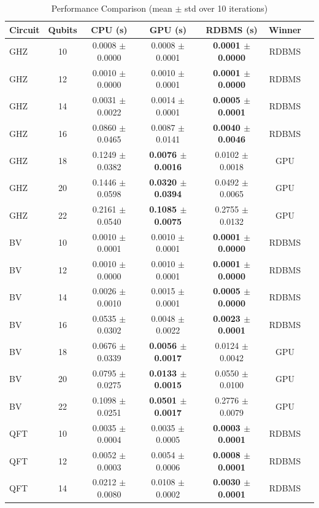 
\begin{table}[htbp]
\centering
\caption{Performance Comparison (mean $\pm$ std over 10 iterations)}
\label{tab:main_results}
\begin{tabular}{lcccccc}
\toprule
\textbf{Circuit} & \textbf{Qubits} & \textbf{CPU (s)} & \textbf{GPU (s)} & \textbf{RDBMS (s)} & \textbf{Winner} \\
\midrule
GHZ & 10 & 0.0008 $\pm$ 0.0000 & 0.0008 $\pm$ 0.0001 & \textbf{0.0001 $\pm$ 0.0000} & RDBMS \\
GHZ & 12 & 0.0010 $\pm$ 0.0000 & 0.0010 $\pm$ 0.0001 & \textbf{0.0001 $\pm$ 0.0000} & RDBMS \\
GHZ & 14 & 0.0031 $\pm$ 0.0022 & 0.0014 $\pm$ 0.0001 & \textbf{0.0005 $\pm$ 0.0001} & RDBMS \\
GHZ & 16 & 0.0860 $\pm$ 0.0465 & 0.0087 $\pm$ 0.0141 & \textbf{0.0040 $\pm$ 0.0046} & RDBMS \\
GHZ & 18 & 0.1249 $\pm$ 0.0382 & \textbf{0.0076 $\pm$ 0.0016} & 0.0102 $\pm$ 0.0018 & GPU \\
GHZ & 20 & 0.1446 $\pm$ 0.0598 & \textbf{0.0320 $\pm$ 0.0394} & 0.0492 $\pm$ 0.0065 & GPU \\
GHZ & 22 & 0.2161 $\pm$ 0.0540 & \textbf{0.1085 $\pm$ 0.0075} & 0.2755 $\pm$ 0.0132 & GPU \\
BV & 10 & 0.0010 $\pm$ 0.0001 & 0.0010 $\pm$ 0.0001 & \textbf{0.0001 $\pm$ 0.0000} & RDBMS \\
BV & 12 & 0.0010 $\pm$ 0.0000 & 0.0010 $\pm$ 0.0001 & \textbf{0.0001 $\pm$ 0.0000} & RDBMS \\
BV & 14 & 0.0026 $\pm$ 0.0010 & 0.0015 $\pm$ 0.0001 & \textbf{0.0005 $\pm$ 0.0000} & RDBMS \\
BV & 16 & 0.0535 $\pm$ 0.0302 & 0.0048 $\pm$ 0.0022 & \textbf{0.0023 $\pm$ 0.0001} & RDBMS \\
BV & 18 & 0.0676 $\pm$ 0.0339 & \textbf{0.0056 $\pm$ 0.0017} & 0.0124 $\pm$ 0.0042 & GPU \\
BV & 20 & 0.0795 $\pm$ 0.0275 & \textbf{0.0133 $\pm$ 0.0015} & 0.0550 $\pm$ 0.0100 & GPU \\
BV & 22 & 0.1098 $\pm$ 0.0251 & \textbf{0.0501 $\pm$ 0.0017} & 0.2776 $\pm$ 0.0079 & GPU \\
QFT & 10 & 0.0035 $\pm$ 0.0004 & 0.0035 $\pm$ 0.0005 & \textbf{0.0003 $\pm$ 0.0001} & RDBMS \\
QFT & 12 & 0.0052 $\pm$ 0.0003 & 0.0054 $\pm$ 0.0006 & \textbf{0.0008 $\pm$ 0.0001} & RDBMS \\
QFT & 14 & 0.0212 $\pm$ 0.0080 & 0.0108 $\pm$ 0.0002 & \textbf{0.0030 $\pm$ 0.0001} & RDBMS \\

\end{tabular}
\end{table}
